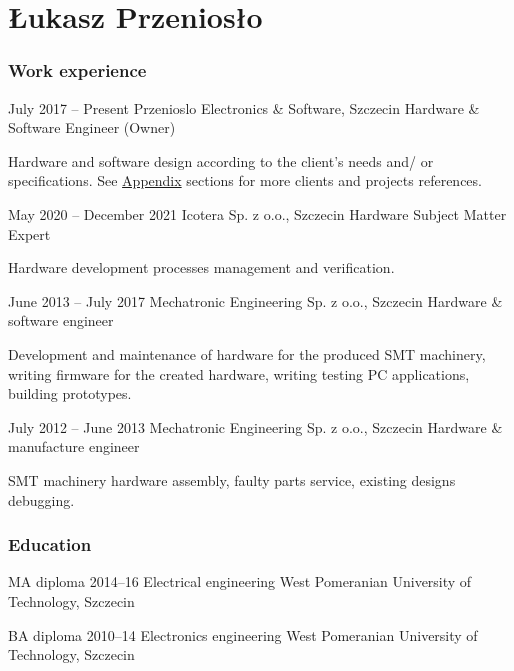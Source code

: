 \documentclass{tccv}
\begin{document}
\part{Łukasz Przeniosło}

\section{Work experience}

\begin{eventlist}

\item{July 2017 -- Present}
     {Przenioslo Electronics \& Software, Szczecin}
     {Hardware \& Software Engineer (Owner)}
     
Hardware and software design according to the client's needs and/ or specifications. See \hyperref[sec:clients]{Appendix} sections for more clients and projects references. 

\item{May 2020 -- December 2021}
     {Icotera Sp. z o.o., Szczecin}
     {Hardware Subject Matter Expert}
     
Hardware development processes management and verification.

\item{June 2013 -- July 2017}
     {Mechatronic Engineering Sp. z o.o., Szczecin}
     {Hardware \& software engineer}
     
Development and maintenance of hardware for the produced SMT machinery, writing firmware for the created hardware, writing testing PC applications, building prototypes. 

\item{July 2012 -- June 2013}
     {Mechatronic Engineering Sp. z o.o., Szczecin}
     {Hardware \& manufacture engineer}

SMT machinery hardware assembly, faulty parts service, existing designs debugging. 

\end{eventlist}

\section{Education}

\begin{yearlist}

\item[MA diploma]{2014--16}
     {Electrical engineering}
     {West Pomeranian University of Technology, Szczecin}

\item[BA diploma]{2010--14}
     {Electronics engineering}
     {West Pomeranian University of Technology, Szczecin}

\end{yearlist}
\end{document}
